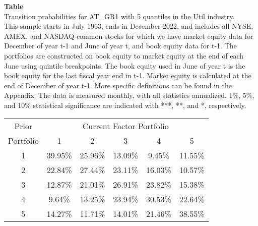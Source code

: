 \begin{table*}[ht!]
\raggedright
{}
\label{tab: transition_probs_AT_GR1_Util_with_5_quantiles}
\textbf{Table \thetable} \\
Transition probabilities for AT_GR1 with 5 quantiles in the Util industry. \\
\hspace*{1em}This sample starts in July 1963, ends in December 2022, and includes all NYSE, AMEX, and NASDAQ common stocks for which we have market equity data for December of year t-1 and June of year t, and book equity data for t-1. The portfolios are constructed on book equity to market equity at the end of each June using quintile breakpoints.  The book equity used in June of year t is the book equity for the last fiscal year end in t-1.  Market equity is calculated at the end of December of year t-1.  More specific definitions can be found in the Appendix.  The data is measured monthly, with all statistics annualized.  1\%, 5\%, and 10\% statistical significance are indicated with ***, **, and *, respectively. \\
\vspace{0.5em}
\centering
\begin{adjustbox}{max width=\textwidth}
\begin{tabular}{@{}cccccc@{}}
\toprule
Prior & \multicolumn{5}{c}{Current Factor Portfolio} \\
Portfolio & 1 & 2 & 3 & 4 & 5 \\
\midrule
1 & 39.95\% & 25.96\% & 13.09\% & 9.45\% & 11.55\% \\
2 & 22.84\% & 27.44\% & 23.11\% & 16.03\% & 10.57\% \\
3 & 12.87\% & 21.01\% & 26.91\% & 23.82\% & 15.38\% \\
4 & 9.64\% & 13.25\% & 23.94\% & 30.53\% & 22.64\% \\
5 & 14.27\% & 11.71\% & 14.01\% & 21.46\% & 38.55\% \\
\bottomrule
\end{tabular}
\end{adjustbox}
\end{table*}
